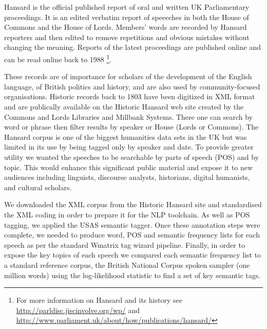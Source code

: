 Hansard is the official published report of oral and written UK Parliamentary proceedings. It is an edited verbatim report of speeeches in both the House of Commons and the House of Lords. Members' words are recorded by Hansard reporters and then edited to remove repetitions and obvious mistakes without changing the meaning. Reports of the latest proceedings are published online
and can be read online back to 1988%
\footnote{For more information on Hansard and its history see \url{http://parldisc.jiscinvolve.org/wp/} and \url{http://www.parliament.uk/about/how/publications/hansard/}}.

These records are of importance for scholars of the development of the English language, of British politics and history, and are also used by community-focused organisations.  Historic records back to 1803 have been digitized in XML format and are publically available on the Historic Hansard web site created by the Commons and Lords Libraries and Millbank Systems. There one can search by word or phrase then filter results by speaker or House (Lords or Commons). 
The Hansard corpus is one of the biggest humanities data sets in the UK but was limited in its use by being tagged only by speaker and date. To provide greater utility we wanted the speeches to be searchable by parts of speech (POS) and by topic. This would enhance this significant public material and expose it to new audiences
including linguists, discourse analysts, historians, digital humanists, and cultural scholars. 

We downloaded the XML corpus from the Historic Hansard site and standardised the XML coding in order to prepare it for the NLP toolchain. As well as POS tagging, we applied the USAS semantic tagger. Once these annotation steps were complete, we needed to produce word, POS and semantic frequency lists for each speech as per the standard Wmatrix tag wizard pipeline. Finally, in order to expose the key topics of each speech we compared each semantic frequency list to a standard reference corpus, the British National Corpus spoken sampler (one million words) using the log-likelihood statistic to find a set of key semantic tags.




